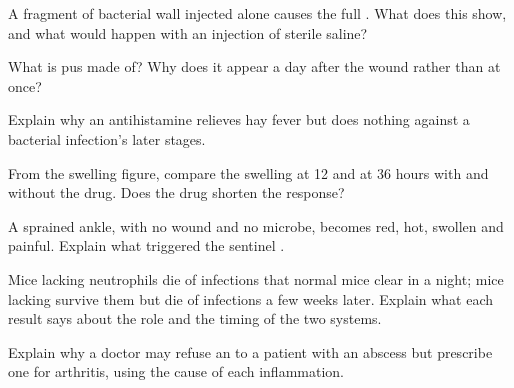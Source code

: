 \begin{exercise}[$\star\star$]\label{exo:g12:innate-immunity:7}
A fragment of bacterial wall injected alone causes the full
. What does this show, and what would happen
with an injection of sterile saline?
\end{exercise}

\begin{exercise}[$\star\star$]\label{exo:g12:innate-immunity:8}
What is pus made of? Why does it appear a day after the wound rather
than at once?
\end{exercise}

\begin{exercise}[$\star\star$]\label{exo:g12:innate-immunity:9}
Explain why an antihistamine relieves hay fever but does nothing
against a bacterial infection's later stages.
\end{exercise}

\begin{exercise}[$\star\star$]\label{exo:g12:innate-immunity:10}
From the swelling figure, compare the swelling at 12 and at 36 hours
with and without the drug. Does the drug shorten the response?
\end{exercise}

\begin{exercise}[$\star\star$]\label{exo:g12:innate-immunity:11}
A sprained ankle, with no wound and no microbe, becomes red, hot,
swollen and painful. Explain what triggered the sentinel .
\end{exercise}

\begin{exercise}[$\star\star\star$]\label{exo:g12:innate-immunity:12}
Mice lacking neutrophils die of infections that normal mice clear in
a night; mice lacking  survive them but die of
infections a few weeks later. Explain what each result says about the
role and the timing of the two systems.
\end{exercise}

\begin{exercise}[$\star\star\star$]\label{exo:g12:innate-immunity:13}
Explain why a doctor may refuse an  to a patient
with an abscess but prescribe one for arthritis, using the cause of
each inflammation.
\end{exercise}

